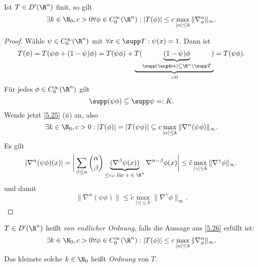 \begin{kor} \label{5.26}
	Ist $T \in D'(\R^n)$ finit, so gilt
	\[
		\exists k \in \N_0, c > 0 \forall \phi \in C_0^\infty(\R^n):
		|T(\phi)| \le c \max_{|\alpha| \le k} \|\nabla_\phi^\alpha \|_\infty.
	\]
	\begin{proof}
		Wähle $\psi \in C_0^\infty(\R^n)$ mit $\forall x \in \supp T : \psi(x) = 1$.
		Dann ist
		\[
			T(\phi)
			= T(\psi \phi + (1-\psi) \phi)
			= T(\psi \phi) + \underbrace{T(\underbrace{(1-\psi) \phi}_{\supp (\argdot) \subset \R^n \setminus \supp T})}_{=0}
			= T(\psi \phi).
		\]
		Für jedes $\phi \in C_0^\infty(\R^n)$ gilt
		\[
			\supp(\psi \phi)
			\subset \supp \psi
			=: K.
		\]
		Wende jetzt \ref{5.25} (ii) an, also
		\[
			\exists k \in \N_0, c > 0 :
			|T(\phi)| = |T(\psi\phi)| \subset c \max_{|\alpha| \le k} \| \nabla^\alpha (\psi\phi) \|_\infty.
		\]
		Es gilt
		\begin{align*}
			|\nabla^\alpha (\psi\phi)(x)|
			= \bigg| \sum_{\beta \le \alpha} \binom{\alpha}{\beta} \underbrace{(\nabla^\beta \psi(x))}_{\le c_\beta \text{ für $x\in \R^n$}} \nabla^{\alpha - \beta} \phi(x) \bigg|
			\le \tilde c \max_{|\gamma|\le k} \|\nabla^\gamma \phi\|_\infty.
		\end{align*}
		und damit
		\[
			\|\nabla^\alpha (\psi \phi)\|
			\le \tilde c \max_{|\gamma| \le k} \|\nabla^\gamma \phi \|_\infty.
		\]
	\end{proof}
\end{kor}

\begin{df} \label{5.27}
	$T \in D'(\R^n)$ heißt \emph{von endlicher Ordnung}, falls die Aussage aus \ref{5.26} erfüllt ist:
	\[
		\exists k \in \N_0, c > 0 \forall \phi \in C_0^\infty(\R^n):
		|T(\phi)| \le c \max_{|\alpha| \le k} \|\nabla_\phi^\alpha \|_\infty.
	\]
	Das kleinste solche $k \in \N_0$ heißt \emph{Ordnung} von $T$.
\end{df}

